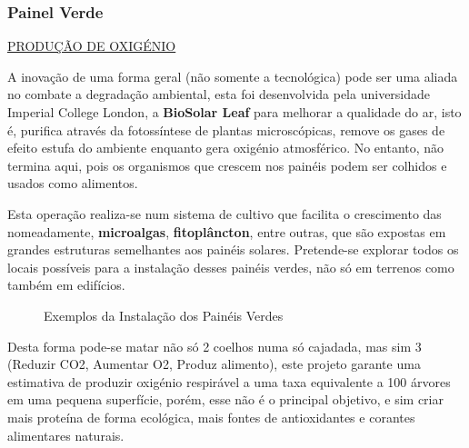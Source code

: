 \documentclass[letterpaper,12pt]{article}
\begin{document}
\subsubsection{Painel Verde}
\underline{PRODUÇÃO DE OXIGÉNIO}
\par \citep{m_2019_painel, savers_2020_este}A inovação de uma forma geral (não somente a tecnológica) pode ser uma aliada no combate a degradação ambiental, esta foi desenvolvida pela universidade Imperial College London, a {\bf BioSolar Leaf} para melhorar a qualidade do ar, isto é, purifica através da fotossíntese de plantas microscópicas, remove os gases de efeito estufa do ambiente enquanto gera oxigénio atmosférico. No entanto, não termina aqui, pois os organismos que crescem nos painéis podem ser colhidos e usados como alimentos.
\par Esta operação realiza-se num sistema de cultivo que facilita o crescimento das nomeadamente, {\bf microalgas}, {\bf fitoplâncton}, entre outras, que são expostas em grandes estruturas semelhantes aos painéis solares. Pretende-se explorar todos os locais possíveis para a instalação desses painéis verdes, não só em terrenos como também em edifícios.
\vspace{0.5cm}
\begin{figure}[!htb]
    \centering
    \caption{Exemplos da Instalação dos Painéis Verdes}
    \label{fig: subfig}
    \hfill
\end{figure}
\par Desta forma pode-se matar não só 2 coelhos numa só cajadada, mas sim 3 (Reduzir CO2, Aumentar O2, Produz alimento), este projeto garante uma estimativa de produzir oxigénio respirável a uma taxa equivalente a 100 árvores em uma pequena superfície, porém, esse não é o principal objetivo, e sim criar mais proteína de forma ecológica, mais fontes de antioxidantes e corantes alimentares naturais.
\end{document}
